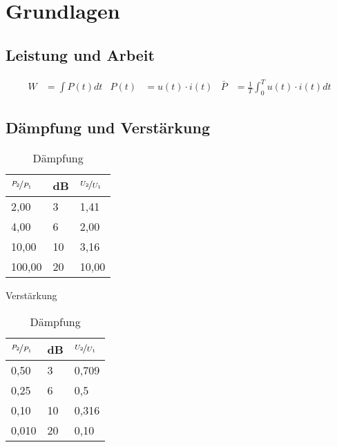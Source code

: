 \chapter{Grundlagen}
	\section{Leistung und Arbeit}
		\begin{align*}
			W&=\int P(t)dt & P(t)&=u(t)\cdot i(t) &
			\bar{P}&=\frac{1}{T}\int_0^Tu(t)\cdot i(t)dt
		\end{align*}

	\section{Dämpfung und Verstärkung}
	\begin{center}
		\begin{table}[h]
		\begin{subtable}{0.5\textwidth}
		\begin{tabular}{lll}
		$\nicefrac{P_2}{P_1}$ & dB & $\nicefrac{U_2}{U_1}$\\
		\toprule
		2,00 & 3 & 1,41\\
		\midrule
		4,00 & 6 & 2,00\\
		\midrule
		10,00 & 10 & 3,16\\
		\midrule
		100,00 & 20 & 10,00\\
		\midrule
		\end{tabular}
		\caption{Verstärkung}
		\end{subtable}
		\begin{subtable}{0.5\textwidth}
		\begin{tabular}{lll}
		$\nicefrac{P_2}{P_1}$ & dB & $\nicefrac{U_2}{U_1}$\\
		\toprule
		0,50 & 3 & 0,709\\
		\midrule
		0,25 & 6 & 0,5\\
		\midrule
		0,10 & 10 & 0,316\\
		\midrule
		0,010 & 20 & 0,10\\
		\midrule
		\end{tabular}
		\caption{Dämpfung}
		\end{subtable}
		\end{table}
	\end{center}

